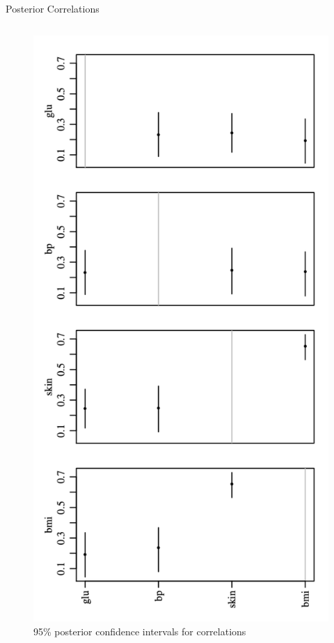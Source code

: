 \documentclass[10pt]{beamer}
\begin{document}
\begin{frame}{Posterior Correlations}
\begin{columns}
\begin{column}{0.4\textwidth}
\begin{figure}
\includegraphics[width=.7\textwidth]{images/pima_correlations}
\caption{95\% posterior confidence intervals for correlations}
\end{figure}
\end{column}


\end{columns}
 \end{frame}
\end{document}
